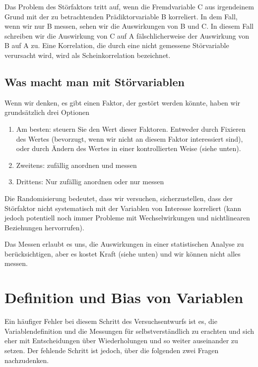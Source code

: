 \documentclass[a4paper,twoside]{tufte-book}\usepackage[]{graphicx}\usepackage[]{color}
\begin{document}
Das Problem des Störfaktors tritt auf, wenn die Fremdvariable C aus irgendeinem Grund mit der zu betrachtenden Prädiktorvariable B korreliert. In dem Fall, wenn wir nur B messen, sehen wir die Auswirkungen von B und C. In diesem Fall schreiben wir die Auswirkung von C auf A fälschlicherweise der Auswirkung von B auf A zu.  Eine Korrelation, die durch eine nicht gemessene Störvariable verursacht wird, wird als Scheinkorrelation bezeichnet.

\subsection{Was macht man mit Störvariablen}

Wenn wir denken, es gibt einen Faktor, der gestört werden könnte, haben wir grundsätzlich drei Optionen

\begin{enumerate}
\item Am besten: steuern Sie den Wert dieser Faktoren. Entweder durch Fixieren des Wertes (bevorzugt, wenn wir nicht an diesem Faktor interessiert sind), oder durch Ändern des Wertes in einer kontrollierten Weise (siehe unten).
\item Zweitens: zufällig anordnen und messen
\item Drittens: Nur zufällig anordnen oder nur messen
\end{enumerate}

Die Randomisierung bedeutet, dass wir versuchen, sicherzustellen, dass der Störfaktor nicht systematisch mit der Variablen von Interesse korreliert (kann jedoch potentiell noch immer Probleme mit Wechselwirkungen und nichtlinearen Beziehungen hervorrufen).


Das Messen erlaubt es uns, die Auswirkungen in einer statistischen Analyse zu berücksichtigen, aber es kostet Kraft (siehe unten) und wir können nicht alles messen.
\section{Definition und Bias von Variablen}

Ein häufiger Fehler bei diesem Schritt des Versuchsentwurfs ist es, die Variablendefinition und die Messungen für selbstverständlich zu erachten und sich eher mit Entscheidungen über Wiederholungen und so weiter auseinander zu setzen. Der fehlende Schritt ist jedoch, über die folgenden zwei Fragen nachzudenken. 
\end{document}

